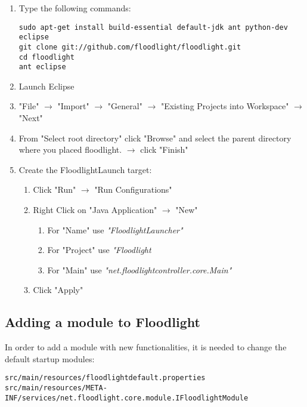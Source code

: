 \begin{enumerate}
\item Type the following commands:\\

\begin{verbatim}
sudo apt-get install build-essential default-jdk ant python-dev eclipse
git clone git://github.com/floodlight/floodlight.git
cd floodlight
ant eclipse

\end{verbatim}

\item Launch Eclipse
\item "File" $\rightarrow$ "Import" $\rightarrow$ "General" $\rightarrow$ "Existing Projects into Workspace" $\rightarrow$ "Next" 
\item From "Select root directory" click "Browse" and select the parent directory where you placed floodlight. $\rightarrow$ click "Finish"
\item Create the FloodlightLaunch target:
	\begin{enumerate}
	\item Click "Run"   $\rightarrow$ "Run Configurations"
	\item Right Click on "Java Application"  $\rightarrow$ "New"
		\begin{enumerate}
		\item For "Name" use \emph{"FloodlightLauncher"}
		\item For "Project" use \emph{"Floodlight}
		\item For "Main" use \emph{"net.floodlightcontroller.core.Main"}
		\end{enumerate}
	\item Click "Apply"
	\end{enumerate}
\end{enumerate}
 
\subsection{Adding a module to Floodlight}

In order to add a module with new functionalities, it is needed to change the default startup modules:\\
\begin{verbatim}src/main/resources/floodlightdefault.properties
src/main/resources/META-INF/services/net.floodlight.core.module.IFloodlightModule

\end{verbatim}

